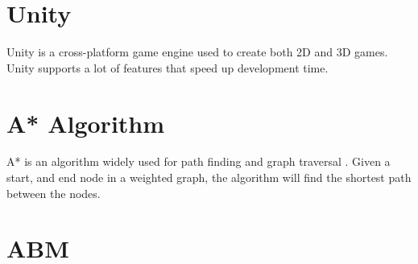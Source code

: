

\section{Unity}
Unity is a cross-platform game engine used to create both 2D and 3D games. Unity supports a lot of features that speed up development time. 



\section{A* Algorithm}
    A* is an algorithm widely used for path finding and graph traversal \cite{A-Star-Algorithm}. Given a start, and end node in a weighted graph, the algorithm will find the shortest path between the nodes. 



\section{ABM}

